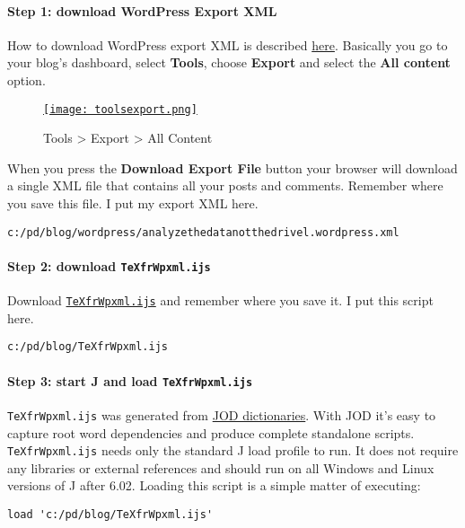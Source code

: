 \paragraph{Step 1: download WordPress Export XML}

How to download WordPress export XML is described
\href{http://en.blog.wordpress.com/2006/06/12/xml-import-export/}{here}.
Basically you go to your blog's dashboard, select \textbf{Tools}, choose
\textbf{Export} and select the \textbf{All content} option.


\captionsetup[figure]{labelformat=empty}
\begin{figure}[htbp]
\centering
\href{http://bakerjd99.files.wordpress.com/2012/02/toolsexport.png}{\texttt{[image: toolsexport.png]}}
\caption{Tools \textgreater{} Export \textgreater{} All  Content}
\label{fig:2518X1}
\end{figure}

When you press the \textbf{Download Export File} button your browser
will download a single XML file that contains all your posts and
comments. Remember where you save this file. I put my export XML here.
\begin{verbatim}
c:/pd/blog/wordpress/analyzethedatanotthedrivel.wordpress.xml
\end{verbatim}

\paragraph{Step 2: download \texttt{TeXfrWpxml.ijs}}

Download
\href{http://www.box.com/s/9v5b6ub9cya108c03mr7}{\texttt{TeXfrWpxml.ijs}}
and remember where you save it. I put this script here.
\begin{verbatim}
c:/pd/blog/TeXfrWpxml.ijs
\end{verbatim}

\paragraph{Step 3: start J and load \texttt{TeXfrWpxml.ijs}}

\texttt{TeXfrWpxml.ijs} was generated from
\href{http://bakerjd99.wordpress.com/the-jod-page/}{JOD dictionaries}.
With JOD it's easy to capture root word dependencies and produce
complete standalone scripts. \texttt{TeXfrWpxml.ijs} needs only the
standard J load profile to run. It does not require any libraries or
external references and should run on all Windows and Linux versions of
J after 6.02. Loading this script is a simple matter of executing:
\begin{verbatim}
load 'c:/pd/blog/TeXfrWpxml.ijs'
\end{verbatim}


